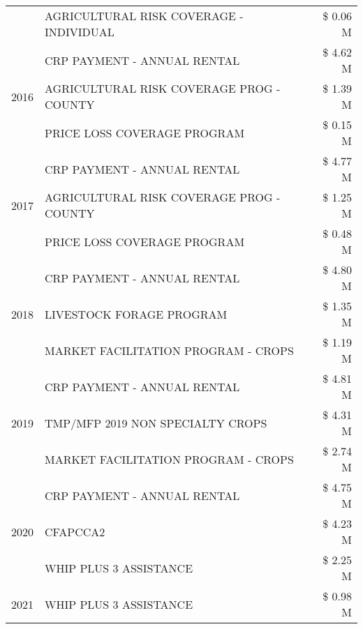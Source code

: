 \begin{tabular}{llr}
 & AGRICULTURAL RISK COVERAGE - INDIVIDUAL & \$ 0.06 M \\
\cline{1-3}
\multirow[t]{3}{*}{2016} & CRP PAYMENT - ANNUAL RENTAL & \$ 4.62 M \\
 & AGRICULTURAL RISK COVERAGE PROG - COUNTY & \$ 1.39 M \\
 & PRICE LOSS COVERAGE PROGRAM & \$ 0.15 M \\
\cline{1-3}
\multirow[t]{3}{*}{2017} & CRP PAYMENT - ANNUAL RENTAL & \$ 4.77 M \\
 & AGRICULTURAL RISK COVERAGE PROG - COUNTY & \$ 1.25 M \\
 & PRICE LOSS COVERAGE PROGRAM & \$ 0.48 M \\
\cline{1-3}
\multirow[t]{3}{*}{2018} & CRP PAYMENT - ANNUAL RENTAL & \$ 4.80 M \\
 & LIVESTOCK FORAGE PROGRAM & \$ 1.35 M \\
 & MARKET FACILITATION PROGRAM - CROPS & \$ 1.19 M \\
\cline{1-3}
\multirow[t]{3}{*}{2019} & CRP PAYMENT - ANNUAL RENTAL & \$ 4.81 M \\
 & TMP/MFP 2019 NON SPECIALTY CROPS & \$ 4.31 M \\
 & MARKET FACILITATION PROGRAM - CROPS & \$ 2.74 M \\
\cline{1-3}
\multirow[t]{3}{*}{2020} & CRP PAYMENT - ANNUAL RENTAL & \$ 4.75 M \\
 & CFAPCCA2 & \$ 4.23 M \\
 & WHIP PLUS 3 ASSISTANCE & \$ 2.25 M \\
\cline{1-3}
2021 & WHIP PLUS 3 ASSISTANCE & \$ 0.98 M \\
\cline{1-3}
\bottomrule
\end{tabular}
